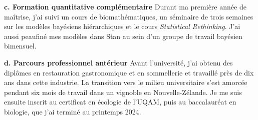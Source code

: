 \documentclass[12pt]{article}
\begin{document}
\textbf{c. Formation quantitative complémentaire} 
Durant ma première année de maîtrise, j'ai suivi un cours de biomathématiques, un séminaire de trois semaines sur les modèles bayésiens hiérarchiques et le cours \textit{Statistical Rethinking}. J'ai aussi peaufiné mes modèles dans Stan au sein d'un groupe de travail bayésien bimensuel.

\textbf{d. Parcours professionnel antérieur} 
Avant l'université, j'ai obtenu des diplômes en restauration gastronomique et en sommellerie et travaillé près de dix ans dans cette industrie. La transition vers le milieu universitaire s'est amorcée pendant six mois de travail dans un vignoble en Nouvelle-Zélande. Je me suis ensuite inscrit au certificat en écologie de l'UQAM, puis au baccalauréat en biologie, que j'ai terminé au printemps 2024.
\end{document}
